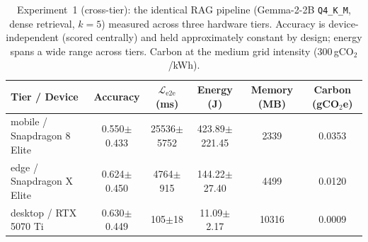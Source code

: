 \begin{table}[t]
\centering
\caption{Experiment~1 (cross-tier): the identical RAG pipeline (Gemma-2-2B \texttt{Q4\_K\_M}, dense retrieval, $k{=}5$) measured across three hardware tiers. Accuracy is device-independent (scored centrally) and held approximately constant by design; energy spans a wide range across tiers. Carbon at the medium grid intensity (300\,gCO$_2$/kWh).}
\label{tab:crosstier}
\small
\begin{tabular}{lccccc}
\toprule
Tier / Device & Accuracy & $\mathcal{L}_\text{e2e}$ (ms) & Energy (J) & Memory (MB) & Carbon (gCO$_2$e) \\
\midrule
mobile / Snapdragon 8 Elite & 0.550$\pm$0.433 & 25536$\pm$5752 & 423.89$\pm$221.45 & 2339 & 0.0353 \\
edge / Snapdragon X Elite & 0.624$\pm$0.450 & 4764$\pm$915 & 144.22$\pm$27.40 & 4499 & 0.0120 \\
desktop / RTX 5070 Ti & 0.630$\pm$0.449 & 105$\pm$18 & 11.09$\pm$2.17 & 10316 & 0.0009 \\
\bottomrule
\end{tabular}
\end{table}